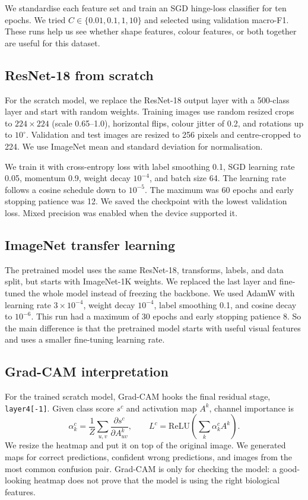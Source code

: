 \documentclass[10pt,twocolumn,letterpaper]{article}
\begin{document}
We standardise each feature set and train an SGD hinge-loss classifier for ten epochs.  We tried $C\in\{0.01,0.1,1,10\}$ and selected using validation macro-F1.  These runs help us see whether shape features, colour features, or both together are useful for this dataset.

\subsection{ResNet-18 from scratch}
For the scratch model, we replace the ResNet-18 output layer with a 500-class layer and start with random weights.  Training images use random resized crops to $224\times224$ (scale 0.65--1.0), horizontal flips, colour jitter of 0.2, and rotations up to $10^{\circ}$.  Validation and test images are resized to 256 pixels and centre-cropped to 224.  We use ImageNet mean and standard deviation for normalisation.

We train it with cross-entropy loss with label smoothing 0.1, SGD learning rate 0.05, momentum 0.9, weight decay $10^{-4}$, and batch size 64.  The learning rate follows a cosine schedule down to $10^{-5}$.  The maximum was 60 epochs and early stopping patience was 12.  We saved the checkpoint with the lowest validation loss.  Mixed precision was enabled when the device supported it.

\subsection{ImageNet transfer learning}
The pretrained model uses the same ResNet-18, transforms, labels, and data split, but starts with ImageNet-1K weights.  We replaced the last layer and fine-tuned the whole model instead of freezing the backbone.  We used AdamW \cite{loshchilov2019decoupled} with learning rate $3\times10^{-4}$, weight decay $10^{-4}$, label smoothing 0.1, and cosine decay to $10^{-6}$.  This run had a maximum of 30 epochs and early stopping patience 8.  So the main difference is that the pretrained model starts with useful visual features and uses a smaller fine-tuning learning rate.

\subsection{Grad-CAM interpretation}
For the trained scratch model, Grad-CAM hooks the final residual stage, \texttt{layer4[-1]}.  Given class score $s^c$ and activation map $A^k$, channel importance is
\begin{equation}
 \alpha_k^c=\frac{1}{Z}\sum_{u,v}\frac{\partial s^c}{\partial A_{uv}^k},\qquad
 L^c=\mathrm{ReLU}\left(\sum_k\alpha_k^cA^k\right).
\end{equation}
We resize the heatmap and put it on top of the original image.  We generated maps for correct predictions, confident wrong predictions, and images from the most common confusion pair.  Grad-CAM is only for checking the model: a good-looking heatmap does not prove that the model is using the right biological features.
\end{document}
